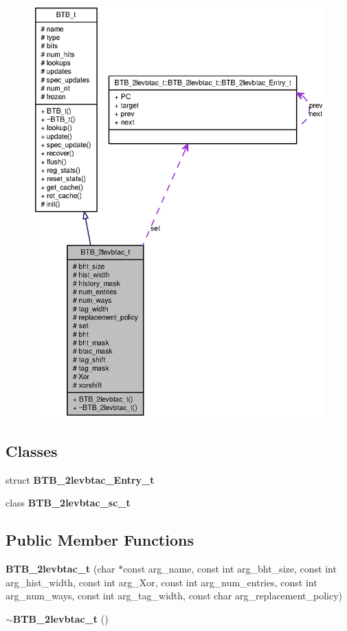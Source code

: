 \begin{figure}[H]
\begin{center}
\leavevmode
\includegraphics[width=400pt]{classBTB__2levbtac__t__coll__graph}
\end{center}
\end{figure}
\subsection*{Classes}
\begin{CompactItemize}
\item 
struct {\bf BTB\_\-2levbtac\_\-Entry\_\-t}
\item 
class {\bf BTB\_\-2levbtac\_\-sc\_\-t}
\end{CompactItemize}
\subsection*{Public Member Functions}
\begin{CompactItemize}
\item 
{\bf BTB\_\-2levbtac\_\-t} (char $\ast$const arg\_\-name, const int arg\_\-bht\_\-size, const int arg\_\-hist\_\-width, const int arg\_\-Xor, const int arg\_\-num\_\-entries, const int arg\_\-num\_\-ways, const int arg\_\-tag\_\-width, const char arg\_\-replacement\_\-policy)
\item 
{\bf $\sim$BTB\_\-2levbtac\_\-t} ()
\end{CompactItemize}
